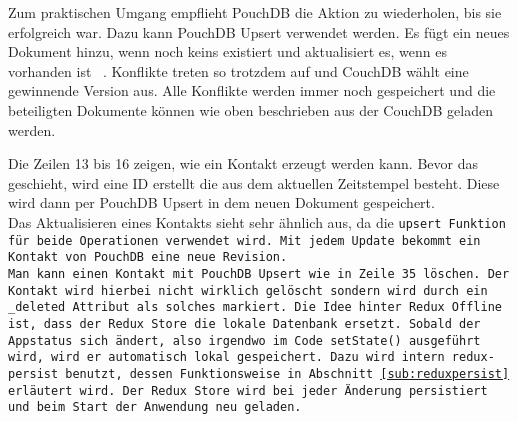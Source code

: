 Zum praktischen Umgang empflieht PouchDB die Aktion zu wiederholen, bis sie erfolgreich war.
Dazu kann PouchDB Upsert verwendet werden.
Es fügt ein neues Dokument hinzu, wenn noch keins existiert und aktualisiert es, wenn es vorhanden ist ~\cite{pouch_conflicts}. Konflikte treten so trotzdem auf und CouchDB wählt eine gewinnende Version aus.
Alle Konflikte werden immer noch gespeichert und die beteiligten Dokumente können wie oben beschrieben aus der CouchDB geladen werden.
%
\begin{center}
  
\end{center}
%
Die Zeilen 13 bis 16 zeigen, wie ein Kontakt erzeugt werden kann. Bevor das geschieht, wird eine ID erstellt die aus dem aktuellen Zeitstempel besteht.
Diese wird dann per PouchDB Upsert in dem neuen Dokument gespeichert.\\
Das Aktualisieren eines Kontakts sieht sehr ähnlich aus, da die \tt{upsert} Funktion für beide Operationen verwendet wird.
Mit jedem Update bekommt ein Kontakt von PouchDB eine neue Revision.\\
Man kann einen Kontakt mit PouchDB Upsert wie in Zeile 35 löschen.
Der Kontakt wird hierbei nicht wirklich gelöscht sondern wird durch ein \tt{\_deleted} Attribut als solches markiert.
%
%
Die Idee hinter Redux Offline ist, dass der Redux Store die lokale Datenbank ersetzt. Sobald der Appstatus sich ändert, also irgendwo im Code \tt{setState()} ausgeführt wird, wird er automatisch lokal gespeichert. Dazu wird intern \tt{redux-persist} benutzt, dessen Funktionsweise in Abschnitt \ref{sub:reduxpersist} erläutert wird. Der Redux Store wird bei jeder Änderung persistiert und beim Start der Anwendung neu geladen.
